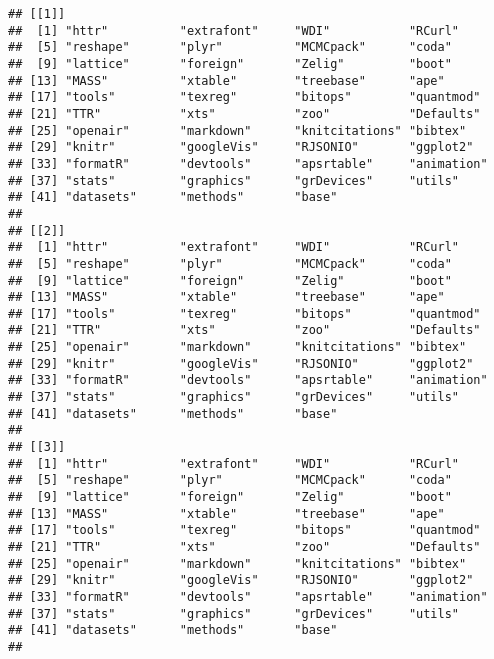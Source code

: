 \begin{knitrout}
\color{fgcolor}\begin{kframe}
\begin{verbatim}
## [[1]]
##  [1] "httr"          "extrafont"     "WDI"           "RCurl"        
##  [5] "reshape"       "plyr"          "MCMCpack"      "coda"         
##  [9] "lattice"       "foreign"       "Zelig"         "boot"         
## [13] "MASS"          "xtable"        "treebase"      "ape"          
## [17] "tools"         "texreg"        "bitops"        "quantmod"     
## [21] "TTR"           "xts"           "zoo"           "Defaults"     
## [25] "openair"       "markdown"      "knitcitations" "bibtex"       
## [29] "knitr"         "googleVis"     "RJSONIO"       "ggplot2"      
## [33] "formatR"       "devtools"      "apsrtable"     "animation"    
## [37] "stats"         "graphics"      "grDevices"     "utils"        
## [41] "datasets"      "methods"       "base"         
## 
## [[2]]
##  [1] "httr"          "extrafont"     "WDI"           "RCurl"        
##  [5] "reshape"       "plyr"          "MCMCpack"      "coda"         
##  [9] "lattice"       "foreign"       "Zelig"         "boot"         
## [13] "MASS"          "xtable"        "treebase"      "ape"          
## [17] "tools"         "texreg"        "bitops"        "quantmod"     
## [21] "TTR"           "xts"           "zoo"           "Defaults"     
## [25] "openair"       "markdown"      "knitcitations" "bibtex"       
## [29] "knitr"         "googleVis"     "RJSONIO"       "ggplot2"      
## [33] "formatR"       "devtools"      "apsrtable"     "animation"    
## [37] "stats"         "graphics"      "grDevices"     "utils"        
## [41] "datasets"      "methods"       "base"         
## 
## [[3]]
##  [1] "httr"          "extrafont"     "WDI"           "RCurl"        
##  [5] "reshape"       "plyr"          "MCMCpack"      "coda"         
##  [9] "lattice"       "foreign"       "Zelig"         "boot"         
## [13] "MASS"          "xtable"        "treebase"      "ape"          
## [17] "tools"         "texreg"        "bitops"        "quantmod"     
## [21] "TTR"           "xts"           "zoo"           "Defaults"     
## [25] "openair"       "markdown"      "knitcitations" "bibtex"       
## [29] "knitr"         "googleVis"     "RJSONIO"       "ggplot2"      
## [33] "formatR"       "devtools"      "apsrtable"     "animation"    
## [37] "stats"         "graphics"      "grDevices"     "utils"        
## [41] "datasets"      "methods"       "base"         
## 

\end{verbatim}
\end{kframe}
\end{knitrout}
